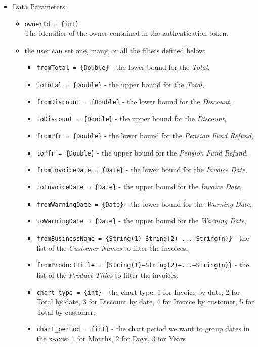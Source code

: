 \begin{itemize}
    \item Data Parameters: 
    \begin{itemize}
        \item \texttt{ownerId = \{int\}} \\
        The identifier of the owner contained in the authentication token.
        \item the user can set one, many, or all the filters defined below: 
        \begin{itemize}
            \item \texttt{fromTotal = \{Double\}} - the lower bound for the \textit{Total},
            \item \texttt{toTotal = \{Double\}} - the upper bound for the \textit{Total},
            \item \texttt{fromDiscount = \{Double\}} - the lower bound for the \textit{Discount}, 
            \item \texttt{toDiscount = \{Double\}} - the upper bound for the \textit{Discount},
            \item \texttt{fromPfr = \{Double\}} - the lower bound for the \textit{Pension Fund Refund}, 
            \item \texttt{toPfr = \{Double\}} - the upper bound for the \textit{Pension Fund Refund},
            \item \texttt{fromInvoiceDate = \{Date\}} - the lower bound for the \textit{Invoice Date}, 
            \item \texttt{toInvoiceDate = \{Date\}} - the upper bound for the \textit{Invoice Date},
            \item \texttt{fromWarningDate = \{Date\}} - the lower bound for the \textit{Warning Date}, 
            \item \texttt{toWarningDate = \{Date\}} - the upper bound for the \textit{Warning Date},
            \item \texttt{fromBusinessName = \{String(1)---String(2)---...---String(n)\}} - the list of the \textit{Customer Names} to filter the invoices,
            \item \texttt{fromProductTitle = \{String(1)---String(2)---...---String(n)\}} - the list of the \textit{Product Titles} to filter the invoices,
            \item \texttt{chart\_type = \{int\}} - the chart type: 1 for Invoice by date, 2 for Total by date, 3 for Discount by date, 4 for Invoice by customer, 5 for Total by customer,
            \item \texttt{chart\_period = \{int\}} - the chart period we want to group dates in the x-axis: 1 for Months, 2 for Days, 3 for Years
        \end{itemize}     
    \end{itemize}
    

\end{itemize}
